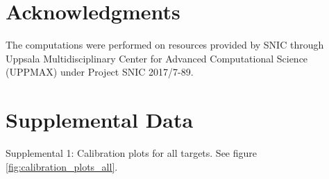 \documentclass[10pt,article]{memoir}
\begin{document}
\section*{Acknowledgments}
The computations were performed on resources provided by SNIC through Uppsala
Multidisciplinary Center for Advanced Computational Science (UPPMAX) under
Project SNIC 2017/7-89.



\newpage
\appendix
\section*{Supplemental Data}
%
%

Supplemental 1: Calibration plots for all targets. See figure
\ref{fig:calibration_plots_all}.
\end{document}
